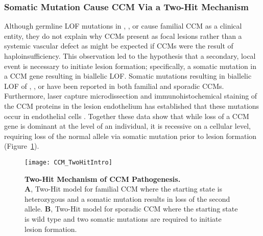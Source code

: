 \subsubsection{Somatic Mutation Cause CCM Via a Two-Hit Mechanism}
Although germline LOF mutations in , , or  cause familial CCM as a clinical entity, they do not explain why CCMs present as focal lesions rather than a systemic vascular defect as might be expected if CCMs were the result of haploinsufficiency. This observation led to the hypothesis that a secondary, local event is necessary to initiate lesion formation; specifically, a somatic mutation in a CCM gene resulting in biallelic LOF. Somatic mutations resulting in biallelic LOF of , , or  have been reported in both familial \citep{gault2005, akers2009, gault2009} and sporadic \citep{mcdonald2014} CCMs. Furthermore, laser capture microdissection and immunohistochemical staining of the CCM proteins in the lesion endothelium has established that these mutations occur in endothelial cells \citep{akers2009, pagenstecher2009, rath2020}. Together these data show that while loss of a CCM gene is dominant at the level of an individual, it is recessive on a cellular level, requiring loss of the normal allele via somatic mutation prior to lesion formation (Figure~\ref{CCM_TwoHitIntro}).   

\begin{figure}[tbp!]
\begin{center}
\texttt{[image: CCM\_TwoHitIntro]}
\end{center}
\caption[Two-Hit Mechanism of CCM Pathogenesis.] {\textbf{Two-Hit Mechanism of CCM Pathogenesis.} \\ \textbf{A}, Two-Hit model for familial CCM where the starting state is heterozygous and a somatic mutation results in loss of the second allele. \textbf{B}, Two-Hit model for sporadic CCM where the starting state is wild type and two somatic mutations  are required to initiate lesion formation.}

\label{CCM_TwoHitIntro}
\end{figure}


